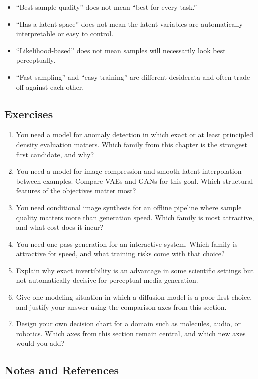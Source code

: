 \begin{itemize}
    \item ``Best sample quality'' does not mean ``best for every task.''
    \item ``Has a latent space'' does not mean the latent variables are automatically interpretable or easy to control.
    \item ``Likelihood-based'' does not mean samples will necessarily look best perceptually.
    \item ``Fast sampling'' and ``easy training'' are different desiderata and often trade off against each other.
\end{itemize}

\subsection*{Exercises}

\begin{enumerate}
    \item You need a model for anomaly detection in which exact or at least principled density evaluation matters. Which family from this chapter is the strongest first candidate, and why?
    \item You need a model for image compression and smooth latent interpolation between examples. Compare VAEs and GANs for this goal. Which structural features of the objectives matter most?
    \item You need conditional image synthesis for an offline pipeline where sample quality matters more than generation speed. Which family is most attractive, and what cost does it incur?
    \item You need one-pass generation for an interactive system. Which family is attractive for speed, and what training risks come with that choice?
    \item Explain why exact invertibility is an advantage in some scientific settings but not automatically decisive for perceptual media generation.
    \item Give one modeling situation in which a diffusion model is a poor first choice, and justify your answer using the comparison axes from this section.
    \item Design your own decision chart for a domain such as molecules, audio, or robotics. Which axes from this section remain central, and which new axes would you add?
\end{enumerate}

\subsection*{Notes and References}

